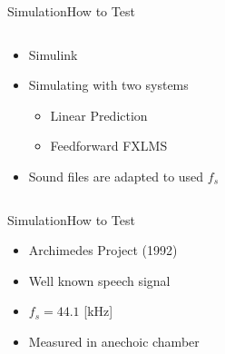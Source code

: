 \begin{frame}{Simulation}{How to Test}	
\begin{columns}
		\begin{column}{0.6\textwidth}				
		\begin{itemize}
			\item Simulink
			\item Simulating with two systems 
			\begin{itemize}
				\item Linear Prediction
				\item Feedforward FXLMS
			\end{itemize}
			\item Sound files are adapted to used $f_s$ 
		\end{itemize}
		\end{column}
		\begin{column}{0.4\textwidth}
		\end{column}
	\end{columns}
\end{frame}

\begin{frame}{Simulation}{How to Test}	
\begin{itemize}
	\item Archimedes Project (1992)
	\item Well known speech signal
	\item $f_s = 44.1$ [kHz] 
	\item Measured in anechoic chamber		
\end{itemize}
\end{frame}

